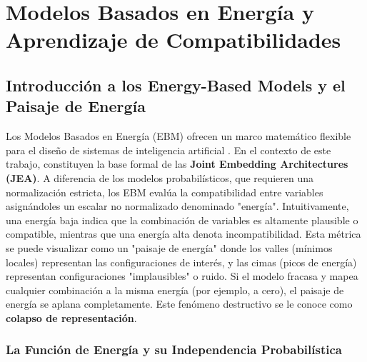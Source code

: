 \chapter{Modelos Basados en Energía y Aprendizaje de Compatibilidades}
\label{cap:ebm_compatibilidades}


\section{Introducción a los Energy-Based Models y el Paisaje de Energía}
\label{sec:intro_ebm}

Los Modelos Basados en Energía (EBM) ofrecen un marco matemático flexible para el diseño de sistemas de inteligencia artificial \cite{lecun2006tutorial}. En el contexto de este trabajo, constituyen la base formal de las \textbf{Joint Embedding Architectures (JEA)}. A diferencia de los modelos probabilísticos, que requieren una  normalización estricta, los EBM evalúa la compatibilidad entre variables asignándoles un escalar no normalizado denominado "energía". Intuitivamente, una energía baja indica que la combinación de variables es altamente plausible o compatible, mientras que una energía alta denota incompatibilidad. Esta métrica se puede visualizar como un "paisaje de energía" donde los valles (mínimos locales) representan las configuraciones de interés, y las cimas (picos de energía) representan configuraciones "implausibles" o ruido. Si el modelo fracasa y mapea cualquier combinación a la misma energía (por ejemplo, a cero), el paisaje de energía se aplana completamente. Este  fenómeno destructivo se le conoce como \textbf{colapso de representación}.

\subsection{La Función de Energía y su Independencia Probabilística}
\label{sec:energy_function}

